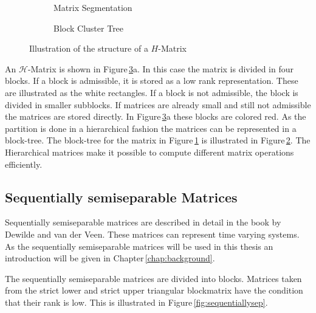 \documentclass[doctype=mastersthesis,BCOR=15mm,biblatex]{ldvbook}%
\begin{document}
\begin{figure}
	\centering
	\begin{subfigure}[b]{0.45\textwidth}
		\centering
		
		\caption{Matrix Segmentation}
		\label{fig:strukturh-matrix_a}
	\end{subfigure}
	\begin{subfigure}[b]{0.45\textwidth}
	\centering
	\resizebox{0.7\textwidth}{!}{
	
	}
	\caption{Block Cluster Tree}
	\label{fig:strukturh-matrix_b}
	\end{subfigure}
	\caption{Illustration of the structure of a $H$-Matrix}
	\label{fig:strukturh-matrix}
\end{figure}


An $\mathcal{H}$-Matrix is shown in Figure\,\ref{fig:strukturh-matrix}a. 
In this case the matrix is divided in four blocks.
If a block is admissible, it is stored as a low rank representation. These are illustrated as the white rectangles.
If a block is not admissible, the block is divided in smaller subblocks.
If matrices are already small and still not admissible the matrices are stored directly. In Figure\,\ref{fig:strukturh-matrix}a these blocks are colored red.
As the partition is done in a hierarchical fashion the matrices can be represented in a block-tree. 
The block-tree for the matrix in Figure\,\ref{fig:strukturh-matrix_a} is illustrated in Figure\,\ref{fig:strukturh-matrix_b}.
The Hierarchical matrices make it possible to compute different matrix operations efficiently. %

\subsection{Sequentially semiseparable Matrices}
Sequentially semiseparable matrices are described in detail in the book by Dewilde and van der Veen\cite{dewilde_time-varying_1998}.
These matrices can represent time varying systems.
As the sequentially semiseparable matrices will be used in this thesis an introduction will be given in Chapter\,\ref{chap:background}. 

The sequentially semiseparable matrices are divided into blocks.
Matrices taken from the strict lower and strict upper triangular blockmatrix have the condition that their rank is low.
This is illustrated in Figure\,\ref{fig:sequentiallysep}.
\end{document}
